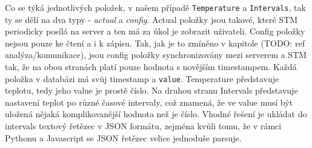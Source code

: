Co se týká jednotlivých položek, v našem případě \texttt{Temperature} a \texttt{Intervals}, tak ty se
dělí na dva typy - \emph{actual} a \emph{config}.
Actual položky jsou takové, které STM periodicky posílá na server a ten má za úkol je zobrazit uživateli.
Config položky nejsou pouze ke čtení a i k zápisu.
Tak, jak je to zmíněno v kapitole (TODO: ref analýza/komunikace), jsou config položky synchronizovány mezi
serverem a STM tak, že na obou stranách platí pouze hodnota s novějším timestampem.
Každá položka v databázi má svůj timestamp a \texttt{value}.
Temperature představuje teplotu, tedy jeho value je prostě číslo.
Na druhou stranu Intervals představuje nastavení teplot po různé časové intervaly, což znamená, že ve
value musí být uložená nějaká komplikovanější hodnota než je číslo.
Vhodné řešení je ukládat do intervals textový řetězec v JSON formátu, zejména kvůli tomu, že v rámci
Pythonu a Javascript se JSON řetězec velice jednoduše parsuje.



